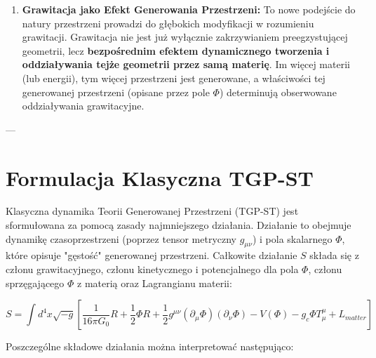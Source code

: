 \documentclass[11pt,a4paper]{article}
\begin{document}
\begin{enumerate}
    \item \textbf{Grawitacja jako Efekt Generowania Przestrzeni:}
    To nowe podejście do natury przestrzeni prowadzi do głębokich modyfikacji w rozumieniu grawitacji. Grawitacja nie jest już wyłącznie zakrzywianiem preegzystującej geometrii, lecz \textbf{bezpośrednim efektem dynamicznego tworzenia i oddziaływania tejże geometrii przez samą materię}. Im więcej materii (lub energii), tym więcej przestrzeni jest generowane, a właściwości tej generowanej przestrzeni (opisane przez pole $\Phi$) determinują obserwowane oddziaływania grawitacyjne.
\end{enumerate}

---

\section{Formulacja Klasyczna TGP-ST}
\label{sec:FormulacjaKlasyczna}

Klasyczna dynamika Teorii Generowanej Przestrzeni (TGP-ST) jest sformułowana za pomocą zasady najmniejszego działania. Działanie to obejmuje dynamikę czasoprzestrzeni (poprzez tensor metryczny $g_{\mu\nu}$) i pola skalarnego $\Phi$, które opisuje "gęstość" generowanej przestrzeni. Całkowite działanie $S$ składa się z członu grawitacyjnego, członu kinetycznego i potencjalnego dla pola $\Phi$, członu sprzęgającego $\Phi$ z materią oraz Lagrangianu materii:

\begin{equation}
    S = \int d^4x \sqrt{-g} \left[ \frac{1}{16\pi G_0}R + \frac{1}{2}\Phi R + \frac{1}{2}g^{\mu\nu}(\partial_\mu\Phi)(\partial_\nu\Phi) - V(\Phi) - g_{c}\Phi T^\mu_\mu + L_{matter} \right]
    \label{eq:FundamentalAction}
\end{equation}

Poszczególne składowe działania można interpretować następująco:
\end{document}
